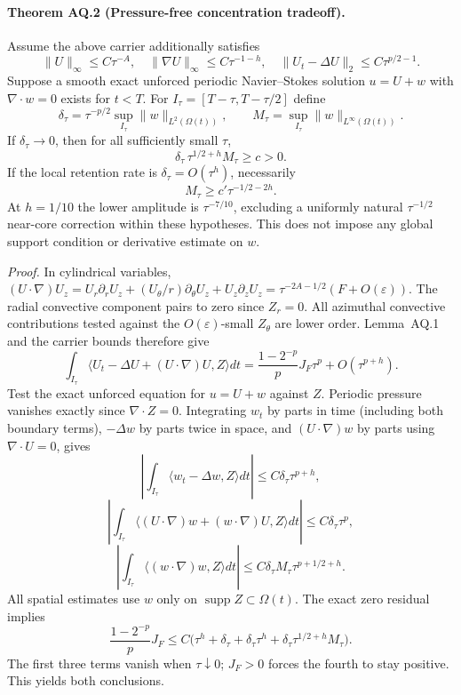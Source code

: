 \paragraph{Theorem AQ.2 (Pressure-free concentration tradeoff).}
Assume the above carrier additionally satisfies
\[
\|U\|_\infty\le C\tau^{-A},\quad
\|\nabla U\|_\infty\le C\tau^{-1-h},\quad
\|U_t-\Delta U\|_2\le C\tau^{p/2-1}.
\]
Suppose a smooth exact unforced periodic Navier--Stokes solution $u=U+w$ with $\nabla\cdot w=0$ exists for $t<T$. For $I_\tau=[T-\tau,T-\tau/2]$ define
\[
\delta_\tau=\tau^{-p/2}\sup_{I_\tau}\|w\|_{L^2(\Omega(t))},
\qquad
M_\tau=\sup_{I_\tau}\|w\|_{L^\infty(\Omega(t))}.
\]
If $\delta_\tau\to0$, then for all sufficiently small $\tau$,
\[
\boxed{\delta_\tau\,\tau^{1/2+h}M_\tau\ge c>0.}
\]
If the local retention rate is $\delta_\tau=O(\tau^h)$, necessarily
\[
\boxed{M_\tau\ge c'\tau^{-1/2-2h}.}
\]
At $h=1/10$ the lower amplitude is $\tau^{-7/10}$, excluding a uniformly natural $\tau^{-1/2}$ near-core correction within these hypotheses. This does not impose any global support condition or derivative estimate on $w$.

\emph{Proof.}
In cylindrical variables,
$(U\cdot\nabla)U_z=U_r\partial_rU_z+(U_\theta/r)\partial_\theta U_z+U_z\partial_zU_z
=\tau^{-2A-1/2}(F+O(\varepsilon))$.
The radial convective component pairs to zero since $Z_r=0$. All azimuthal convective contributions tested against the $O(\varepsilon)$-small $Z_\theta$ are lower order. Lemma~AQ.1 and the carrier bounds therefore give
\[
\int_{I_\tau}
\langle U_t-\Delta U+(U\cdot\nabla)U,Z\rangle dt
=\frac{1-2^{-p}}p J_F\tau^p+O(\tau^{p+h}).
\]
Test the exact unforced equation for $u=U+w$ against $Z$. Periodic pressure vanishes exactly since $\nabla\cdot Z=0$. Integrating $w_t$ by parts in time (including both boundary terms), $-\Delta w$ by parts twice in space, and $(U\cdot\nabla)w$ by parts using $\nabla\cdot U=0$, gives
\[
\left|\int_{I_\tau}\langle w_t-\Delta w,Z\rangle dt\right|
 \le C\delta_\tau\tau^{p+h},
\]
\[
\left|\int_{I_\tau}
\langle(U\cdot\nabla)w+(w\cdot\nabla)U,Z\rangle dt\right|
\le C\delta_\tau\tau^p,
\]
\[
\left|\int_{I_\tau}\langle(w\cdot\nabla)w,Z\rangle dt\right|
\le C\delta_\tau M_\tau\tau^{p+1/2+h}.
\]
All spatial estimates use $w$ only on $\operatorname{supp}Z\subset\Omega(t)$.
The exact zero residual implies
\[
\frac{1-2^{-p}}p J_F
\le C\bigl(\tau^h+\delta_\tau+\delta_\tau\tau^h
+\delta_\tau\tau^{1/2+h}M_\tau\bigr).
\]
The first three terms vanish when $\tau\downarrow0$; $J_F>0$ forces the fourth to stay positive. This yields both conclusions.


